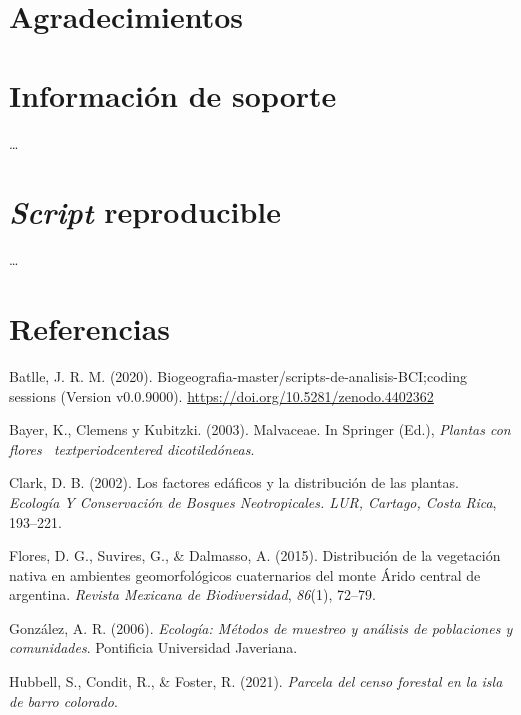 \documentclass[11pt,]{article}
\begin{document}
\section{Agradecimientos}\label{agradecimientos}

\section{Información de soporte}\label{informaciuxf3n-de-soporte}

\ldots

\section{\texorpdfstring{\emph{Script}
reproducible}{Script reproducible}}\label{script-reproducible}

\ldots

\section*{Referencias}\label{referencias}

\hypertarget{refs}{}
\hypertarget{ref-jose_ramon_martinez_batlle_2020_4402362}{}
Batlle, J. R. M. (2020).
Biogeografia-master/scripts-de-analisis-BCI;coding sessions (Version
v0.0.9000). \url{https://doi.org/10.5281/zenodo.4402362}

\hypertarget{ref-bayer2003malvaceae}{}
Bayer, K., Clemens y Kubitzki. (2003). Malvaceae. In Springer (Ed.),
\emph{Plantas con flores ~textperiodcentered dicotiledóneas}.

\hypertarget{ref-clark2002factores}{}
Clark, D. B. (2002). Los factores edáficos y la distribución de las
plantas. \emph{Ecología Y Conservación de Bosques Neotropicales. LUR,
Cartago, Costa Rica}, 193--221.

\hypertarget{ref-flores2015distribucion}{}
Flores, D. G., Suvires, G., \& Dalmasso, A. (2015). Distribución de la
vegetación nativa en ambientes geomorfológicos cuaternarios del monte
Árido central de argentina. \emph{Revista Mexicana de Biodiversidad},
\emph{86}(1), 72--79.

\hypertarget{ref-gonzalez2006ecologia}{}
González, A. R. (2006). \emph{Ecología: Métodos de muestreo y análisis
de poblaciones y comunidades}. Pontificia Universidad Javeriana.

\hypertarget{ref-webcenso}{}
Hubbell, S., Condit, R., \& Foster, R. (2021). \emph{Parcela del censo
forestal en la isla de barro colorado}.
\end{document}
